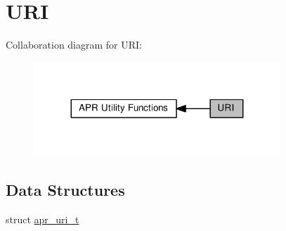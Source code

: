 \hypertarget{group__APR__Util__URI}{}\section{U\+RI}
\label{group__APR__Util__URI}
Collaboration diagram for U\+RI\+:
\nopagebreak
\begin{figure}[H]
\begin{center}
\leavevmode
\includegraphics[width=263pt]{group__APR__Util__URI}
\end{center}
\end{figure}
\subsection*{Data Structures}
\begin{DoxyCompactItemize}
\item 
struct \hyperlink{structapr__uri__t}{apr\+\_\+uri\+\_\+t}
\end{DoxyCompactItemize}
